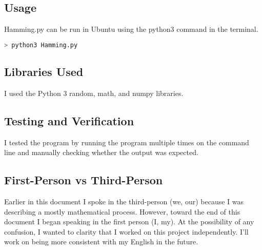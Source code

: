 \documentclass[12pt]{article}
\begin{document}
\subsection*{Usage}
\noindent Hamming.py can be run in Ubuntu using the python3 command in the terminal. 

\begin{lstlisting}[frame=single,language=Python,caption=main \label{code:makeMessage}]
  > python3 Hamming.py
\end{lstlisting}
\subsection*{Libraries Used}
\noindent I used the Python 3 random, math, and numpy libraries.

\subsection*{Testing and Verification}
\noindent I tested the program by running the program multiple times on the command line
and manually checking whether the output was expected.

\subsection*{First-Person vs Third-Person}
Earlier in this document I spoke in the third-person (we, our) because I was describing 
a mostly mathematical process. However, toward the end of this document I began 
speaking in the first person (I, my). At the possibility of any confusion,
I wanted to clarity that I worked on this project independently. 
I'll work on being more consistent with my English in the future.
\end{document}

